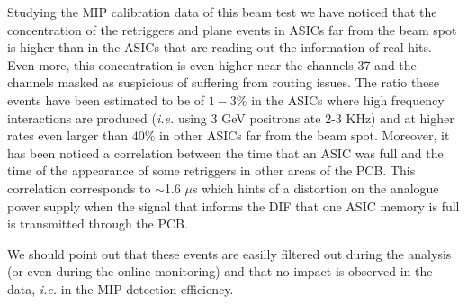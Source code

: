 \documentclass[a4paper,11pt]{article}
\begin{document}
Studying the MIP calibration data of this beam test we have noticed that the 
concentration of the retriggers and plane events in
ASICs far from the beam spot is higher than in the ASICs that are reading
out the information of real hits. Even more, this concentration is even higher near the channels
37 and the channels masked as suspicious of suffering from routing issues.
The ratio these events have been estimated to be of $1-3\%$ in the ASICs where high frequency
interactions are produced ({\it i.e.} using 3 GeV positrons ate 2-3 KHz) and at higher rates even larger than $40\%$ in other 
ASICs far from the beam spot. 
Moreover, it has been noticed a correlation between the time that an ASIC was full and the time of the appearance of some 
retriggers in other areas of the PCB. 
This correlation corresponds to $\sim$1.6 $\mu$s which hints
of a distortion on the analogue power supply when
the signal that informs the DIF that one ASIC memory is full is transmitted through the PCB.

We should point out that these events are easilly filtered out during the analysis (or even during the online monitoring)
and that no impact is observed
in the data, {\it i.e.} in the MIP detection efficiency.





\end{document}
